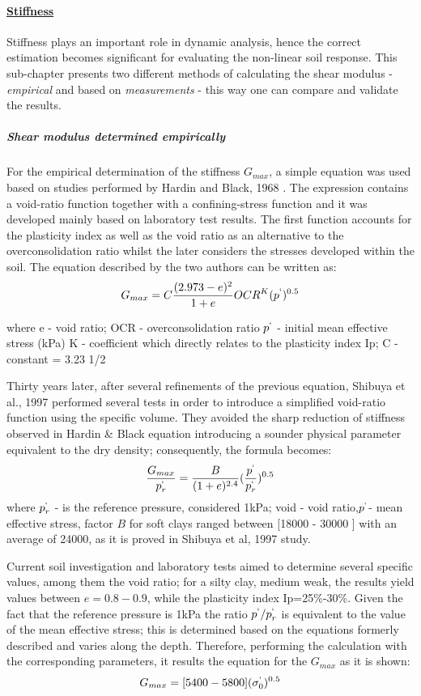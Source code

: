 \documentclass[11pt,a4paper]{report}
\begin{document}
\paragraph{\underline{Stiffness}}
Stiffness plays an important role in dynamic analysis, hence the correct estimation becomes significant for evaluating the non-linear soil response. This sub-chapter presents two different methods of calculating the shear modulus - \textit{empirical} and based on \textit{measurements} - this way one can compare and validate the results.

\subparagraph{Shear modulus determined empirically}
For the empirical determination of the stiffness $G_{max}$, a simple equation was used based on studies performed by Hardin and Black, 1968 \cite{hardin1972shear}. The expression contains a void-ratio function together with a confining-stress function and it was developed mainly based on laboratory test results. The first function accounts for the plasticity index as well as the void ratio as an alternative to the overconsolidation ratio whilst the later considers the stresses developed within the soil. The equation described by the two authors can be written as:
\begin{equation}
	G_{max}=C \frac{(2.973-e)^2}{1+e}OCR^K(p^`)^{0.5}
\end{equation}

where e - void ratio;
OCR - overconsolidation ratio
$p^`$ - initial mean effective stress (kPa)
K - coefficient which directly relates to the plasticity index Ip;
C - constant = 3.23 1/2 

Thirty years later, after several refinements of the previous equation, Shibuya et al., 1997 \cite{shibuya1997elastic} performed several tests in order to introduce a simplified void-ratio function using the specific volume. They avoided the sharp reduction of stiffness observed in Hardin \& Black equation introducing a sounder physical parameter equivalent to the dry density; consequently, the formula becomes:
\begin{equation}
\frac{G_{max}}{p^`_r}=\frac{B}{(1+e)^{2.4}}(\frac{p^`}{p^`_r})^{0.5}
\end{equation}
where $p^`_r$ - is the reference pressure, considered 1kPa; \gls{void} - void ratio,$p^`$- mean effective stress, factor $B$ for soft clays ranged between [18000 - 30000 ] with an average of 24000, as it is proved in Shibuya et al, 1997 study.

Current soil investigation and laboratory tests aimed to determine several specific values, among them the void ratio; for a silty clay, medium weak, the results yield values between $e=0.8-0.9$, while the plasticity index Ip=25\%-30\%. Given the fact that the reference pressure is 1kPa the ratio $p^`/p^`_r$ is equivalent to the value of the mean effective stress; this is determined based on the equations formerly described and varies along the depth. Therefore, performing the calculation with the corresponding parameters, it results the equation for the $G_{max}$ as it is shown:
\begin{equation}
	G_{max}=[5400-5800](\sigma^`_0)^{0.5}
\end{equation}
\end{document}
